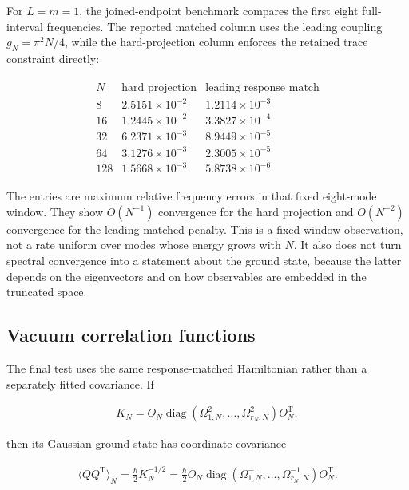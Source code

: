 For $L=m=1$, the joined-endpoint benchmark compares the first eight full-interval frequencies. The reported matched column uses the leading coupling $g_N=\pi^2N/4$, while the hard-projection column enforces the retained trace constraint directly:

\begin{align}
\begin{array}{c|cc}
N&\text{hard projection}&\text{leading response match}\\ \hline
8&2.5151\times10^{-2}&1.2114\times10^{-3}\\
16&1.2445\times10^{-2}&3.3827\times10^{-4}\\
32&6.2371\times10^{-3}&8.9449\times10^{-5}\\
64&3.1276\times10^{-3}&2.3005\times10^{-5}\\
128&1.5668\times10^{-3}&5.8738\times10^{-6}
\end{array}
\end{align}

The entries are maximum relative frequency errors in that fixed eight-mode window. They show $O(N^{-1})$ convergence for the hard projection and $O(N^{-2})$ convergence for the leading matched penalty. This is a fixed-window observation, not a rate uniform over modes whose energy grows with $N$. It also does not turn spectral convergence into a statement about the ground state, because the latter depends on the eigenvectors and on how observables are embedded in the truncated space.

\subsection{Vacuum correlation functions}\label{subsec:interval-correlators}

The final test uses the same response-matched Hamiltonian rather than a separately fitted covariance. If

\begin{align}
K_N=O_N\operatorname{diag}
(\Omega_{1,N}^2,\ldots,\Omega_{r_N,N}^2)O_N^{\mathrm T},
\end{align}

then its Gaussian ground state has coordinate covariance

\begin{align}
\langle QQ^{\mathrm T}\rangle_N
=\frac{\hbar}{2}K_N^{-1/2}
=\frac{\hbar}{2}O_N\operatorname{diag}
(\Omega_{1,N}^{-1},\ldots,\Omega_{r_N,N}^{-1})O_N^{\mathrm T}.
\end{align}


